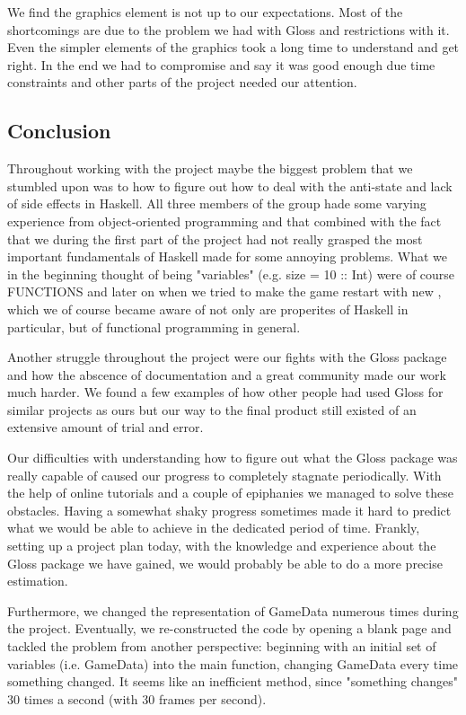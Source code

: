 \documentclass[12pt, a4paper]{article}
\begin{document}
We find the graphics element is not up to our expectations. Most of the shortcomings are due to the problem we had with Gloss and restrictions with it. Even the simpler elements of the graphics took a long time to understand and get right. In the end we had to compromise and say it was good enough due time constraints and other parts of the project needed our attention. 


\subsection{Conclusion}
Throughout working with the project maybe the biggest problem that we stumbled upon was to how to figure out how to deal with the anti-state and lack of side effects in Haskell. All three members of the group hade some varying experience from object-oriented programming and that combined with the fact that we during the first part of the project had not really grasped the most important fundamentals of Haskell made for some annoying problems. What we in the beginning thought of being "variables" (e.g. size = 10 :: Int) were of course FUNCTIONS and later on when we tried to make the game restart with new , which we of course became aware of not only are properites of Haskell in particular, but of functional programming in general. 

Another struggle throughout the project were our fights with the Gloss package and how the abscence of documentation and a great community made our work much harder. We found a few examples of how other people had used Gloss for similar projects as ours but our way to the final product still existed of an extensive amount of trial and error. 

Our difficulties with understanding how to figure out what the Gloss package was really capable of caused our progress to completely stagnate periodically. With the help of online tutorials and a couple of epiphanies we managed to solve these obstacles. Having a somewhat shaky progress sometimes made it hard to predict what we would be able to achieve in the dedicated period of time. Frankly, setting up a project plan today, with the knowledge and experience about the Gloss package we have gained, we would probably be able to do a more precise estimation.

Furthermore, we changed the representation of GameData numerous times during the project. Eventually, we re-constructed the code by opening a blank page and tackled the problem from another perspective: beginning with an initial set of variables (i.e. GameData) into the main function, changing GameData every time something changed. It seems like an inefficient method, since "something changes" 30 times a second (with 30 frames per second).
\end{document}

